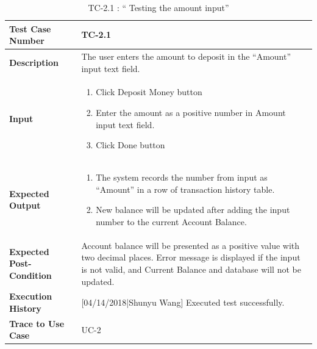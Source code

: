 \documentclass[12pt]{article}
\begin{document}
\begin{table}[H]
\caption{TC-2.1 : “ Testing the amount input”}
\begin{center}
\begin{tabular}{|p{5.5	cm}|p{11cm}|}
\hline
\bf Test Case Number & 
TC-2.1 \\
\hline
\bf Description & 
The user enters the amount to deposit in the “Amount” input text field.\\
\hline
\bf Input & 
\begin{enumerate}
  \item Click Deposit Money button
  \item Enter the amount as a positive number in Amount input text field.
  \item Click Done button
\end{enumerate} \\
\hline
\bf Expected Output & 
\begin{enumerate}
  \item The system records the number from input as “Amount” in a row of transaction history table.
  \item New balance will be updated after adding the input number to the current Account Balance.
\end{enumerate} \\
\hline
\bf Expected Post-Condition & 
Account balance will be presented as a positive value with two decimal places. Error message is displayed if the input is not valid, and Current Balance and database will not be updated.\\
\hline
\bf Execution History & 
[04/14/2018|Shunyu Wang] Executed test successfully.\\
\hline
\bf Trace to Use Case & 
UC-2\\
\hline

\end{tabular}
\end{center}
\end{table}
\end{document}
